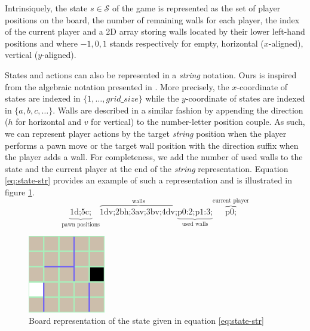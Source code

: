 \documentclass[journal, a4paper]{IEEEtran}
\begin{document}
Intrinsiquely, the state $s\in\mathcal{S}$ of the game is represented as the set of player positions on the board, the number of remaining walls for each player, the index of the current player and a 2D array storing walls located by their lower left-hand positions and where $-1, 0, 1$ stands respectively for empty, horizontal ($x$-aligned), vertical ($y$-aligned).

States and actions can also be represented in a \textit{string} notation. Ours is inspired from the algebraic notation presented in \cite{quoridor-wikipedia}. More precisely, the $x$-coordinate of states are indexed in $\{1, \ldots, grid\_ size\}$ while the $y$-coordinate of states are indexed in $\{a, b, c, \ldots\}$. Walls are described in a similar fashion by appending the direction ($h$ for horizontal and $v$ for vertical) to the number-letter position couple. As such, we can represent player actions by the target \textit{string} position when the player performs a pawn move or the target wall position with the direction suffix when the player adds a wall. For completeness, we add the number of used walls to the state and the current player at the end of the \textit{string} representation. Equation \ref{eq:state-str} provides an example of such a representation and is illustrated in figure \ref{fig:state-str}.
\begin{equation}
    \label{eq:state-str}
    \underbrace{\text{1d;5c;}}_\text{pawn positions}\overbrace{\text{1dv;2bh;3av;3bv;4dv;}}^\text{walls}\underbrace{\text{p0:2;p1:3;}}_\text{used walls}\overbrace{\text{p0;}}^\text{current player}
\end{equation}
\begin{figure}
    \centering
    \includegraphics[width=0.3\textwidth]{figures/state-str.png}
    \caption{Board representation of the state given in equation \ref{eq:state-str}}
    \label{fig:state-str}
\end{figure}
\end{document}
